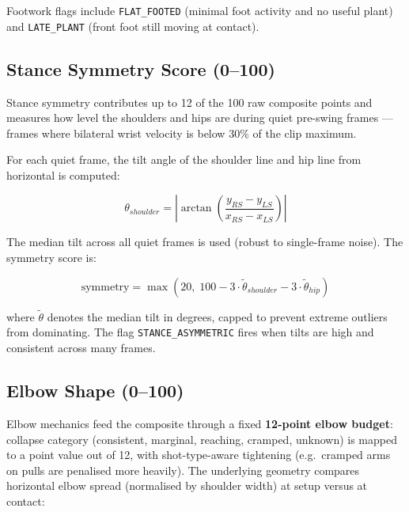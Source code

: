 \begin{justify}
\par Footwork flags include \texttt{FLAT\_FOOTED} (minimal foot activity and no useful plant) and \texttt{LATE\_PLANT} (front foot still moving at contact).

\subsection{Stance Symmetry Score (0--100)}

\par Stance symmetry contributes up to 12 of the 100 raw composite points and measures how level the shoulders and hips are during quiet pre-swing frames — frames where bilateral wrist velocity is below 30\% of the clip maximum.

\par For each quiet frame, the tilt angle of the shoulder line and hip line from horizontal is computed:

\begin{equation}
    \theta_{shoulder} = \left| \arctan\left(\frac{y_{RS} - y_{LS}}{x_{RS} - x_{LS}}\right) \right|
\end{equation}

\par The median tilt across all quiet frames is used (robust to single-frame noise). The symmetry score is:

\begin{equation}
    \text{symmetry} = \max\left(20, \; 100 - 3 \cdot \tilde{\theta}_{shoulder} - 3 \cdot \tilde{\theta}_{hip}\right)
\end{equation}

where $\tilde{\theta}$ denotes the median tilt in degrees, capped to prevent extreme outliers from dominating. The flag \texttt{STANCE\_ASYMMETRIC} fires when tilts are high and consistent across many frames.

\subsection{Elbow Shape (0--100)}

\par Elbow mechanics feed the composite through a fixed \textbf{12-point elbow budget}: collapse category (consistent, marginal, reaching, cramped, unknown) is mapped to a point value out of 12, with shot-type-aware tightening (e.g.\ cramped arms on pulls are penalised more heavily). The underlying geometry compares horizontal elbow spread (normalised by shoulder width) at setup versus at contact:


\end{justify}
